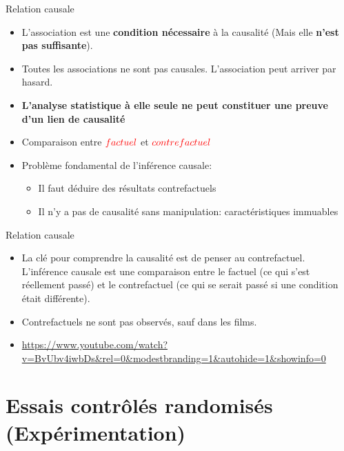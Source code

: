\documentclass[ignorenonframetext,]{beamer}
\providecommand{\tightlist}{%
  \setlength{\itemsep}{0pt}\setlength{\parskip}{0pt}}
\begin{document}
\begin{frame}{Relation causale}
\protect\hypertarget{relation-causale}{}

\begin{itemize}
\tightlist
\item
  L'association est une \textbf{condition nécessaire} à la causalité
  (Mais elle \textbf{n'est pas suffisante}).
\item
  Toutes les associations ne sont pas causales. L'association peut
  arriver par hasard.
\item
  \textbf{L'analyse statistique à elle seule ne peut constituer une
  preuve d'un lien de causalité}
\item
  Comparaison entre \textbf{\(\color{red}{factuel}\)} et
  \textbf{\(\color{red}{contrefactuel}\)}
\item
  Problème fondamental de l'inférence causale:

  \begin{itemize}
  \tightlist
  \item
    Il faut déduire des résultats contrefactuels
  \item
    Il n'y a pas de causalité sans manipulation: caractéristiques
    immuables
  \end{itemize}
\end{itemize}

\end{frame}

\begin{frame}{Relation causale}
\protect\hypertarget{relation-causale-1}{}

\begin{itemize}
\item
  La clé pour comprendre la causalité est de penser au contrefactuel.
  L'inférence causale est une comparaison entre le factuel (ce qui s'est
  réellement passé) et le contrefactuel (ce qui se serait passé si une
  condition était différente).
\item
  Contrefactuels ne sont pas observés, sauf dans les films.
\item
  \url{https://www.youtube.com/watch?v=BvUbv4iwbDs\&rel=0\&modestbranding=1\&autohide=1\&showinfo=0}
\end{itemize}

\end{frame}

\hypertarget{essais-controles-randomises-experimentation}{%
\section{Essais contrôlés randomisés
(Expérimentation)}\label{essais-controles-randomises-experimentation}}
\end{document}
